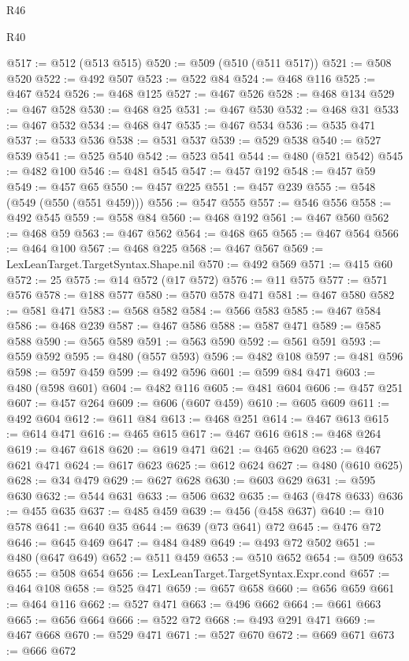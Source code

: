 \begin{lexlean}{R46}
\begin{lexlean}{R40}
\begin{coremodule}
{{{{{{{{{{{{{{{{{{{{{{{{{{{{{{{{{{{{{{{{{{{{{{{{{{{{{{{{{{{{{{{{{{{{{{{{{{{{{{{{{{{{{{{{{{{{{{{{{{{{{{{{{{{{{@517 := @512 (@513 @515)
@520 := @509 (@510 (@511 @517))
@521 := @508 @520
@522 := @492 @507
@523 := @522 @84
@524 := @468 @116
@525 := @467 @524
@526 := @468 @125
@527 := @467 @526
@528 := @468 @134
@529 := @467 @528
@530 := @468 @25
@531 := @467 @530
@532 := @468 @31
@533 := @467 @532
@534 := @468 @47
@535 := @467 @534
@536 := @535 @471
@537 := @533 @536
@538 := @531 @537
@539 := @529 @538
@540 := @527 @539
@541 := @525 @540
@542 := @523 @541
@544 := @480 (@521 @542)
@545 := @482 @100
@546 := @481 @545
@547 := @457 @192
@548 := @457 @59
@549 := @457 @65
@550 := @457 @225
@551 := @457 @239
@555 := @548 (@549 (@550 (@551 @459)))
@556 := @547 @555
@557 := @546 @556
@558 := @492 @545
@559 := @558 @84
@560 := @468 @192
@561 := @467 @560
@562 := @468 @59
@563 := @467 @562
@564 := @468 @65
@565 := @467 @564
@566 := @464 @100
@567 := @468 @225
@568 := @467 @567
@569 := LexLeanTarget.TargetSyntax.Shape.nil
@570 := @492 @569
@571 := @415 @60
@572 := 25
@575 := @14 @572 (@17 @572)
@576 := @11 @575
@577 := @571 @576
@578 := @188 @577
@580 := @570 @578 @471
@581 := @467 @580
@582 := @581 @471
@583 := @568 @582
@584 := @566 @583
@585 := @467 @584
@586 := @468 @239
@587 := @467 @586
@588 := @587 @471
@589 := @585 @588
@590 := @565 @589
@591 := @563 @590
@592 := @561 @591
@593 := @559 @592
@595 := @480 (@557 @593)
@596 := @482 @108
@597 := @481 @596
@598 := @597 @459
@599 := @492 @596
@601 := @599 @84 @471
@603 := @480 (@598 @601)
@604 := @482 @116
@605 := @481 @604
@606 := @457 @251
@607 := @457 @264
@609 := @606 (@607 @459)
@610 := @605 @609
@611 := @492 @604
@612 := @611 @84
@613 := @468 @251
@614 := @467 @613
@615 := @614 @471
@616 := @465 @615
@617 := @467 @616
@618 := @468 @264
@619 := @467 @618
@620 := @619 @471
@621 := @465 @620
@623 := @467 @621 @471
@624 := @617 @623
@625 := @612 @624
@627 := @480 (@610 @625)
@628 := @34 @479
@629 := @627 @628
@630 := @603 @629
@631 := @595 @630
@632 := @544 @631
@633 := @506 @632
@635 := @463 (@478 @633)
@636 := @455 @635
@637 := @485 @459
@639 := @456 (@458 @637)
@640 := @10 @578
@641 := @640 @35
@644 := @639 (@73 @641) @72
@645 := @476 @72
@646 := @645 @469
@647 := @484 @489
@649 := @493 @72 @502
@651 := @480 (@647 @649)
@652 := @511 @459
@653 := @510 @652
@654 := @509 @653
@655 := @508 @654
@656 := LexLeanTarget.TargetSyntax.Expr.cond
@657 := @464 @108
@658 := @525 @471
@659 := @657 @658
@660 := @656 @659
@661 := @464 @116
@662 := @527 @471
@663 := @496 @662
@664 := @661 @663
@665 := @656 @664
@666 := @522 @72
@668 := @493 @291 @471
@669 := @467 @668
@670 := @529 @471
@671 := @527 @670
@672 := @669 @671
@673 := @666 @672
}}}}}}}}}}}}}}}}}}}}}}}}}}}}}}}}}}}}}}}}}}}}}}}}}}}}}}}}}}}}}}}}}}}}}}}}}}}}}}}}}}}}}}}}}}}}}}}}}}}}}}}}}}}}}
\end{coremodule}
\end{lexlean}
\end{lexlean}
